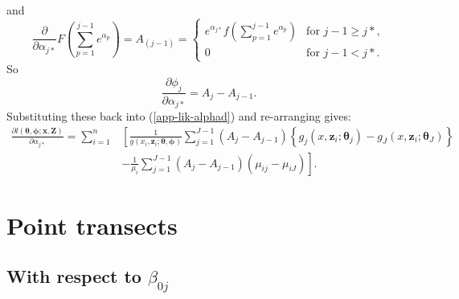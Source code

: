 and
\begin{equation*}
\frac{\partial}{\partial \alpha_{j*}} F \left (\sum_{p=1}^{j-1} e^{\alpha_p} \right )=A_{(j-1)}=\begin{cases}
e^{\alpha_{j*}}f \left (\sum_{p=1}^{j-1} e^{\alpha_p} \right )& \text{for $j-1\geq j*$},\\
0 & \text{for $j-1<j*$}.
\end{cases}
\end{equation*}
So
\begin{equation*}
\frac{\partial \phi_j}{\partial \alpha_{j*}} = A_j - A_{j-1}.
\end{equation*}
Substituting these back into (\ref{app-lik-alphad}) and re-arranging gives:
\begin{align*}
\frac{\partial l(\bm{\theta},\bm{\phi}; \mathbf{x},\mathbf{Z})}{\partial \alpha_{j*}} = \sum_{i=1}^n & \left [ \frac{1}{g(x_i,\mathbf{z}_i; \bm{\theta},\bm{\phi})} \sum_{j=1}^{J-1} \left (A_j - A_{j-1} \right ) \left \{ g_j(x,\mathbf{z}_i; \bm{\theta}_j) - g_J(x,\mathbf{z}_i; \bm{\theta}_J) \right \} \right. \\
&- \left. \frac{1}{\mu_i} \sum_{j=1}^{J-1} \left (A_j - A_{j-1}\right ) \left (\mu_{ij} - \mu_{iJ} \right ) \right ].
\end{align*}

\section{Point transects}

\subsection{With respect to $\beta_{0j}$}

